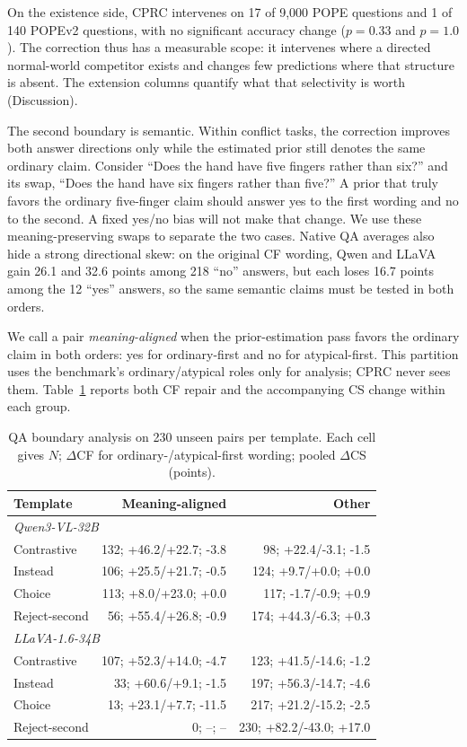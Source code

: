 \documentclass[letterpaper]{article}
\begin{document}
On the existence side, CPRC intervenes on 17 of 9,000 POPE
questions and 1 of 140 POPEv2 questions, with no significant accuracy change
($p=0.33$ and $p=1.0$). The correction thus has a measurable scope: it
intervenes where a directed normal-world competitor exists and changes few
predictions where that structure is absent. The extension columns quantify what that
selectivity is worth (Discussion).

The second boundary is semantic. Within conflict tasks, the correction
improves both answer directions only while the estimated prior still denotes
the same ordinary claim.
Consider ``Does the hand have five fingers rather than six?'' and its
swap, ``Does the hand have six fingers rather than five?'' A prior that truly
favors the ordinary five-finger claim should answer yes to the first wording and
no to the second. A fixed yes/no bias will not make that change. We use these
meaning-preserving swaps to separate the two cases. Native QA averages also
hide a strong directional skew: on the original CF wording,
Qwen and LLaVA gain 26.1 and 32.6 points among 218 ``no'' answers, but each
loses 16.7 points among the 12 ``yes'' answers, so the same semantic claims
must be tested in both orders.

We call a pair \emph{meaning-aligned} when the prior-estimation pass favors the ordinary
claim in both orders: yes for ordinary-first and no for atypical-first. This
partition uses the benchmark's ordinary/atypical roles only for analysis; CPRC
never sees them. Table~\ref{tab:equivariance}
reports both CF repair and the accompanying CS change within each group.

\begin{table}[!tb]
\centering
\footnotesize
\setlength{\tabcolsep}{2.5pt}
{\scriptsize
\begin{tabular*}{\columnwidth}{@{\extracolsep{\fill}}lrr@{}}
\toprule
Template & Meaning-aligned & Other \\
\midrule
\multicolumn{3}{l}{\itshape Qwen3-VL-32B} \\
Contrastive & 132; +46.2/+22.7; -3.8 & 98; +22.4/-3.1; -1.5 \\
Instead & 106; +25.5/+21.7; -0.5 & 124; +9.7/+0.0; +0.0 \\
Choice & 113; +8.0/+23.0; +0.0 & 117; -1.7/-0.9; +0.9 \\
Reject-second & 56; +55.4/+26.8; -0.9 & 174; +44.3/-6.3; +0.3 \\
\midrule
\multicolumn{3}{l}{\itshape LLaVA-1.6-34B} \\
Contrastive & 107; +52.3/+14.0; -4.7 & 123; +41.5/-14.6; -1.2 \\
Instead & 33; +60.6/+9.1; -1.5 & 197; +56.3/-14.7; -4.6 \\
Choice & 13; +23.1/+7.7; -11.5 & 217; +21.2/-15.2; -2.5 \\
Reject-second & 0; --; -- & 230; +82.2/-43.0; +17.0 \\
\bottomrule
\end{tabular*}}
\caption{QA boundary analysis on 230 unseen pairs per template. Each cell gives
$N$; $\Delta$CF for ordinary-/atypical-first wording; pooled $\Delta$CS (points).}
\label{tab:equivariance}
\end{table}
\end{document}
